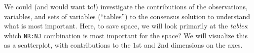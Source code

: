 \documentclass[
]{book}
\newenvironment{Shaded}{\begin{snugshade}}{\end{snugshade}}
\newcommand{\AttributeTok}[1]{\textcolor[rgb]{0.13,0.29,0.53}{#1}}
\newcommand{\CommentTok}[1]{\textcolor[rgb]{0.56,0.35,0.01}{\textit{#1}}}
\newcommand{\FunctionTok}[1]{\textcolor[rgb]{0.13,0.29,0.53}{\textbf{#1}}}
\newcommand{\NormalTok}[1]{#1}
\newcommand{\OtherTok}[1]{\textcolor[rgb]{0.56,0.35,0.01}{#1}}
\newcommand{\SpecialCharTok}[1]{\textcolor[rgb]{0.81,0.36,0.00}{\textbf{#1}}}
\newcommand{\StringTok}[1]{\textcolor[rgb]{0.31,0.60,0.02}{#1}}
\begin{document}
We could (and would want to!) investigate the contributions of the observations, variables, and sets of variables (``tables'') to the consensus solution to understand what is most important. Here, to save space, we will look primarily at the \emph{tables}: which \texttt{NR:NJ} combination is most important for the space? We will visualize this as a scatterplot, with contributions to the 1st and 2nd dimensions on the axes.

\begin{Shaded}
\end{Shaded}
\end{document}
